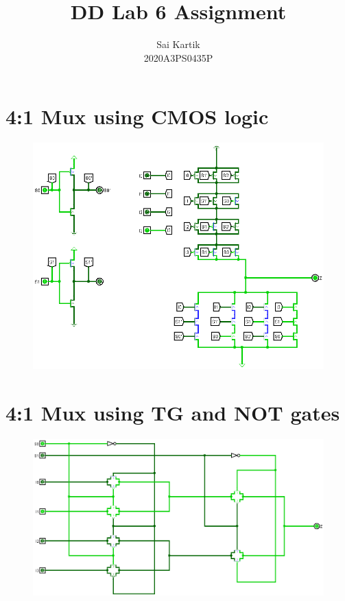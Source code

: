 \documentclass[12pt]{article}
\title{DD Lab 6 Assignment}
\author{Sai Kartik \\2020A3PS0435P}
\begin{document}
\maketitle
    \section{4:1 Mux using CMOS logic}
    \begin{center}
        \begin{figure}[ht]
            \includegraphics[scale=0.50]{cmos.png}
        \end{figure}
    \end{center}
    \newpage
    \section{4:1 Mux using TG and NOT gates}
    \begin{center}
        \begin{figure}[ht]
            \includegraphics[scale=0.50]{tg.png}
        \end{figure}
    \end{center}
\end{document}
